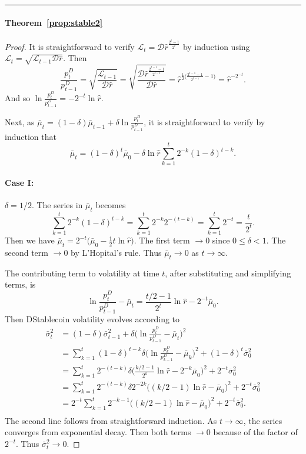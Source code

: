 \noindent\rule{\textwidth}{1pt}
\paragraph{Theorem~\ref{prop:stable2}} \hypertarget{pf:stable2}{}
\begin{proof}
	It is straightforward to verify $\mathcal{L}_t = \mathcal{D}\hat{r}^{\frac{2^t-1}{2^t}}$ by induction using $\mathcal{L}_t = \sqrt{\mathcal{L}_{t-1} \mathcal{D} \hat r}$. Then
	$$\frac{p_t^D}{p_{t-1}^D} = \sqrt{\frac{\mathcal{L}_{t-1}}{\mathcal{D}\hat r}}
	= \sqrt{\frac{\mathcal{D}\hat{r}^{\frac{2^{t-1}-1}{2^{t-1}}}}{\mathcal{D}\hat r}}
	= \hat{r}^{\frac{1}{2}\Big(\frac{2^{t-1}-1}{2^{t-1}}-1\Big)} = \hat{r}^{-2^{-t}}.$$
	And so $\ln \frac{p_t^D}{p_{t-1}^D} = -2^{-t} \ln \hat r$.
	
	Next, as $\bar\mu_t = (1-\delta)\bar\mu_{t-1} + \delta \ln \frac{p_t^D}{p_{t-1}^D}$, it is straightforward to verify by induction that
	$$\bar\mu_t = (1-\delta)^t \bar\mu_0 - \delta \ln \hat r \sum_{k=1}^t 2^{-k}(1-\delta)^{t-k}.$$
	
	\paragraph{Case I:} $\delta = 1/2$. The series in $\bar\mu_t$ becomes
	$$\sum_{k=1}^t 2^{-k}(1-\delta)^{t-k} = \sum_{k=1}^t 2^{-k} 2^{-(t-k)}
	= \sum_{k=1}^t 2^{-t} = \frac{t}{2^t}.$$
	Then we have
	$\bar\mu_t = 2^{-t}\Big( \bar\mu_0 - \frac{1}{2}t \ln \hat r\Big)$.
	The first term $\rightarrow 0$ since $0\leq \delta < 1$. The second term $\rightarrow 0$ by L'Hopital's rule. Thus $\bar\mu_t \rightarrow 0$ as $t\rightarrow \infty$.
	
	The contributing term to volatility at time $t$, after substituting and simplifying terms, is
	$$\ln \frac{p_t^D}{p_{t-1}^D} - \bar\mu_t
	= \frac{t/2-1}{2^t}\ln \hat r - 2^{-t} \bar\mu_0.$$
	Then DStablecoin volatility evolves according to
	$$\begin{aligned}
	\bar\sigma_t^2 &= (1-\delta)\bar\sigma_{t-1}^2 + \delta\Big(\ln \frac{p^D_t}{p^D_{t-1}} - \bar\mu_t\Big)^2 \\
	&= \sum_{k=1}^t (1-\delta)^{t-k} \delta \Big(\ln \frac{p_k^D}{p_{k-1}^D} -\bar\mu_k\Big)^2 + (1-\delta)^t \bar\sigma_0^2 \\
	&= \sum_{k=1}^t 2^{-(t-k)} \delta \Big( \frac{k/2-1}{2^k}\ln \hat r - 2^{-k} \bar\mu_0 \Big)^2 + 2^{-t} \bar\sigma_0^2 \\
	&= \sum_{k=1}^t 2^{-(t-k)} \delta 2^{-2k} \Big( (k/2-1)\ln \hat r - \bar\mu_0\Big)^2 + 2^{-t} \bar\sigma_0^2 \\
	&= 2^{-t} \sum_{k=1}^t 2^{-k-1} \Big( (k/2-1)\ln \hat r - \bar\mu_0\Big)^2 + 2^{-t} \bar\sigma_0^2. \\
	\end{aligned}$$
	The second line follows from straightforward induction. As $t\rightarrow\infty$, the series converges from exponential decay. Then both terms $\rightarrow 0$ because of the factor of $2^{-t}$. Thus $\bar\sigma_t^2 \rightarrow 0$.
	

\end{proof}
